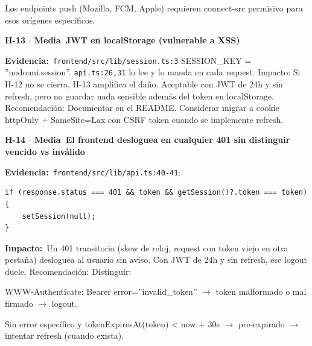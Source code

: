 \documentclass[10pt,a4paper]{article}
\newcommand{\code}[1]{\nolinkurl{#1}}
\newcommand{\badgeMedia}{\colorbox{yellow!35}{\textcolor{brown!90!black}{\textbf{\footnotesize Media}}}}
\begin{document}
Los endpoints push (Mozilla, FCM, Apple) requieren connect-src permisivo para esos orígenes específicos.\par\vspace{0.4em}
\vspace{0.8em}\noindent\textbf{\large H-13 $\cdot$ \badgeMedia\  JWT en localStorage (vulnerable a XSS)}\par\vspace{0.3em}
\noindent\textbf{Evidencia:}\ \code{frontend/src/lib/session.ts:3} SESSION\_KEY = ''nodouni.session''. \code{api.ts:26,31} lo lee y lo manda en cada request.  Impacto: Si H-12 no se cierra, H-13 amplifica el daño. Aceptable con JWT de 24h y sin refresh, pero no guardar nada sensible además del token en localStorage.  Recomendación: Documentar en el README. Considerar migrar a cookie httpOnly + SameSite=Lax con CSRF token cuando se implemente refresh.\par\vspace{0.4em}
\vspace{0.8em}\noindent\textbf{\large H-14 $\cdot$ \badgeMedia\  El frontend desloguea en cualquier 401 sin distinguir vencido vs inválido}\par\vspace{0.3em}
\noindent\textbf{Evidencia:}\ \code{frontend/src/lib/api.ts:40-41}:\par\vspace{0.4em}
\begin{tcolorbox}[colback=codebg,colframe=gray!40,arc=1mm]\small
\begin{verbatim}
if (response.status === 401 && token && getSession()?.token === token) {
    setSession(null);
}
\end{verbatim}
\end{tcolorbox}\vspace{0.4em}
\noindent\textbf{Impacto:}\ Un 401 transitorio (skew de reloj, request con token viejo en otra pestaña) desloguea al usuario sin aviso. Con JWT de 24h y sin refresh, ese logout duele.  Recomendación: Distinguir:\par\vspace{0.4em}
WWW-Authenticate: Bearer error=''invalid\_token'' $\rightarrow$ token malformado o mal firmado $\rightarrow$ logout.\par\vspace{0.4em}
Sin error específico y tokenExpiresAt(token) < now + 30s $\rightarrow$ pre-expirado $\rightarrow$ intentar refresh (cuando exista).\par\vspace{0.4em}
\end{document}
